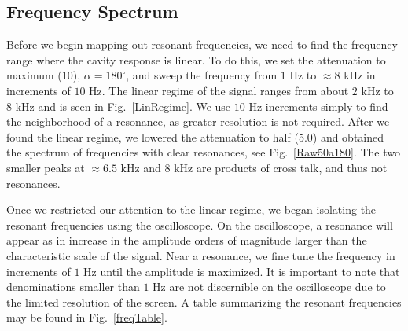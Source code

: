 \documentclass[12pt]{article}
\renewcommand{\deg}{^\circ} %
\newcommand{\figref}[1]{Fig.\ \ref{#1}}
\begin{document}
		
		\subsection{Frequency Spectrum}
		Before we begin mapping out resonant frequencies, we need to find the frequency range where the cavity response is linear. To do this, we set the attenuation to maximum (10), $\alpha = 180 \deg$, and sweep the frequency from $1$ Hz to $\approx 8$ kHz in increments of $10$ Hz. The linear regime of the signal ranges from about $2$ kHz to $8$ kHz and is seen in \figref{LinRegime}. We use $10$ Hz increments simply to find the neighborhood of a resonance, as greater resolution is not required. After we found the linear regime, we lowered the attenuation to half (5.0) and obtained the spectrum of frequencies with clear resonances, see \figref{Raw50a180}. The two smaller peaks at $\approx 6.5$ kHz and $8$ kHz are products of cross talk, and thus not resonances.
		
		Once we restricted our attention to the linear regime, we began isolating the resonant frequencies using the oscilloscope. On the oscilloscope, a resonance will appear as in increase in the amplitude orders of magnitude larger than the characteristic scale of the signal. Near a resonance, we fine tune the frequency in increments of $1$ Hz until the amplitude is maximized. It is important to note that denominations smaller than $1$ Hz are not discernible on the oscilloscope due to the limited resolution of the screen. A table summarizing the resonant frequencies may be found in \figref{freqTable}.
		
\end{document}
